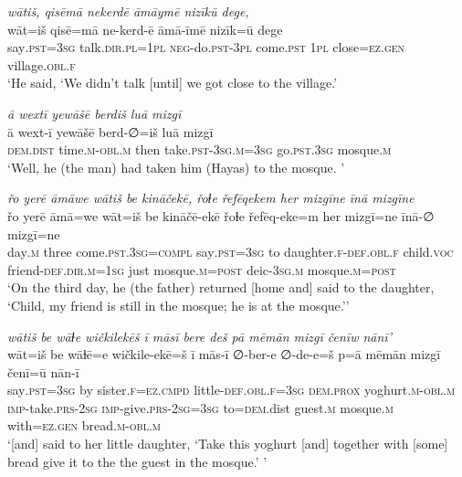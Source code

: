 \ea \label{ŽH.30}
\textit{wātiš, qisēmā nekerdē āmāymē nizīkū dege,} \\ 
\gll wāt=iš qisē=mā ne-kerd-ē āmā-īmē nizīk=ū dege \\ 
 say\textsc{.pst}\textsc{=3sg} talk\textsc{.dir}\textsc{.pl}\textsc{=1pl} \textsc{neg-}do\textsc{.pst}\textsc{-3pl} come\textsc{.pst} \textsc{1pl} close\textsc{=ez}\textsc{.gen} village\textsc{.obl}\textsc{\textsc{.f}} \\ 
\glt `He said, ‘We didn’t talk [until] we got close to the village.'
\z 
 
\ea \label{ŽH.35}
\textit{ā wextī yewāšē berdiš luā mizgī} \\ 
\gll ā wext-ī yewāšē berd-∅=iš luā mizgī \\ 
 \textsc{dem.dist} time\textsc{.m}\textsc{-obl}\textsc{.m} then take\textsc{.pst}\textsc{-3sg}\textsc{.m}\textsc{=3sg} go\textsc{.pst}\textsc{.3sg} mosque\textsc{.m} \\ 
\glt `Well, he (the man) had taken him (Hayas) to the mosque. '
\z 
 
\ea \label{ŽH.37}
\textit{řo yerē āmāwe wātiš be kināčekē, řoɫe řefēqekem her mizgīne īnā mizgīne} \\ 
\gll řo yerē āmā=we wāt=iš be kināčē-ekē řoɫe řefēq-eke=m her mizgī=ne īnā-∅ mizgī=ne \\ 
 day\textsc{.m} three come\textsc{.pst}\textsc{.3sg}\textsc{=compl} say\textsc{.pst}\textsc{=3sg} to daughter\textsc{\textsc{.f}}\textsc{-def}\textsc{.obl}\textsc{\textsc{.f}} child.\textsc{voc} friend\textsc{-def}\textsc{.dir}\textsc{.m}\textsc{=1sg} just mosque\textsc{.m}\textsc{=\textsc{post}} deic\textsc{-3sg}\textsc{.m} mosque\textsc{.m}\textsc{=\textsc{post}} \\ 
\glt `On the third day, he (the father) returned [home and] said to the daughter, ‘Child, my friend is still in the mosque; he is at the mosque.’'
\z 
 
\ea \label{ŽH.40}
\textit{wātiš be wāɫe wičkilekēš ī māsī bere deš pā mēmān mizgī čenīw nānī’} \\ 
\gll wāt=iš be wāɫē=e wičkile-ekē=š ī mās-ī ∅-ber-e ∅-de-e=š p=ā mēmān mizgī čenī=ū nān-ī \\ 
 say\textsc{.pst}\textsc{=3sg} by sister\textsc{\textsc{.f}}\textsc{=ez}\textsc{.cmpd} little\textsc{-def}\textsc{.obl}\textsc{\textsc{.f}}\textsc{=3sg} \textsc{dem.prox} yoghurt\textsc{.m}\textsc{-obl}\textsc{.m} \textsc{imp-}take\textsc{.prs}-\textsc{2sg} \textsc{imp-}give\textsc{.prs}-\textsc{2sg}\textsc{=3sg} to\textsc{=dem}.dist guest\textsc{.m} mosque\textsc{.m} with\textsc{=ez}\textsc{.gen} bread\textsc{.m}\textsc{-obl}\textsc{.m} \\ 
\glt `[and] said to her little daughter, ‘Take this yoghurt [and] together with [some] bread give it to the the guest in the mosque.’ '
\z 
 
